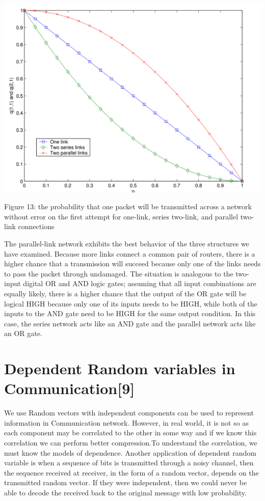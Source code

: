 \documentclass[10pt,twocolumn,letterpaper]{article}
\begin{document}
\includegraphics[width=\linewidth]{plots/fig13.PNG}
\caption{Figure 13: the probability that one packet will be transmitted across a network without error on the first attempt for one-link, series two-link, and parallel two-link connections}


The parallel-link network exhibits the best behavior of the three structures we have examined. Because more links connect a common pair of routers, there is a higher chance that a transmission will succeed because only one of the links needs to pass the packet through undamaged. The situation is analogous to the two-input digital OR and AND logic gates; assuming that all input combinations are equally likely, there is a higher chance that the output of the OR gate will be logical HIGH because only one of its inputs needs to be HIGH, while both of the inputs to the AND gate need to be HIGH for the same output condition. In this case, the series network acts like an AND gate and the parallel network acts like an OR gate.

\section{Dependent Random variables in Communication{\small[9]}}

We use Random vectors with independent components can be used to represent information in Communication network. However, in real world, it is not so as each component may be correlated to the other in some way and if we know this correlation we can perform better compression.To understand the correlation, we must know the models of dependence. Another application of dependent random variable is when a sequence of bits is transmitted through a noisy channel, then the sequence received at receiver, in the form of a random vector, depends on the transmitted random vector. If they were independent, then we could never be able to decode the received back to the original message with low probability.
\end{document}
